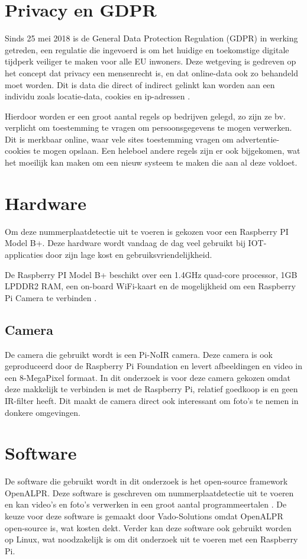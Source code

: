 \section{Privacy en GDPR}
\label{sec:privacy-en-gdpr}

Sinds 25 mei 2018 is de General Data Protection Regulation (GDPR) in werking getreden, een regulatie die ingevoerd is om het huidige en toekomstige digitale tijdperk veiliger te maken voor alle EU inwoners.
Deze wetgeving is gedreven op het concept dat privacy een mensenrecht is, en dat online-data ook zo behandeld moet worden. Dit is data die direct of indirect gelinkt kan worden aan een individu zoals locatie-data, cookies en ip-adressen \autocite{goddard2017eu}.

Hierdoor worden er een groot aantal regels op bedrijven gelegd, zo zijn ze bv. verplicht om toestemming te vragen om persoonsgegevens te mogen verwerken. Dit is merkbaar online, waar vele sites toestemming vragen om advertentie-cookies te mogen opslaan. Een heleboel andere regels zijn er ook bijgekomen, wat het moeilijk kan maken om een nieuw systeem te maken die aan al deze voldoet.

\section{Hardware}
Om deze nummerplaatdetectie uit te voeren is gekozen voor een Raspberry PI Model B+. Deze hardware wordt vandaag de dag veel gebruikt bij IOT-applicaties door zijn lage kost en gebruiksvriendelijkheid.  

De Raspberry PI Model B+ beschikt over een 1.4GHz quad-core processor, 1GB LPDDR2 RAM, een on-board WiFi-kaart en de mogelijkheid om een Raspberry Pi Camera te verbinden \autocite{raspberrypisitemodelbplus} .

\subsection{Camera}
De camera die gebruikt wordt is een Pi-NoIR camera. Deze camera is ook geproduceerd door de Raspberry Pi Foundation en levert afbeeldingen en video in een 8-MegaPixel formaat. In dit onderzoek is voor deze camera gekozen omdat deze makkelijk te verbinden is met de Raspberry Pi, relatief goedkoop is en geen IR-filter heeft. Dit maakt de camera direct ook interessant om foto's te nemen in donkere omgevingen. \autocite{raspberrypisitemodelpinoir}

\section{Software}
De software die gebruikt wordt in dit onderzoek is het open-source framework OpenALPR. Deze software is geschreven om nummerplaatdetectie uit te voeren en kan video's en foto's verwerken in een groot aantal programmeertalen \autocite{openalprgithub}. De keuze voor deze software is gemaakt door Vado-Solutions omdat OpenALPR open-source is, wat kosten dekt. Verder kan deze software ook gebruikt worden op Linux, wat noodzakelijk is om dit onderzoek uit te voeren met een Raspberry Pi.